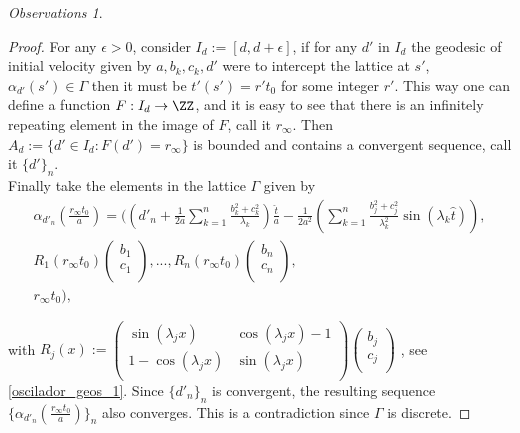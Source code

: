 \documentclass[11pt]{amsart}
\theoremstyle{plain}
\theoremstyle{definition}
\theoremstyle{remark}
\newtheorem{obs}[thm]{Observations}
\begin{document}
\begin{obs}
\begin{proof}
For any $\epsilon >0$, consider $I_d := [d, d+ \epsilon]$, if for any $d'$ in $I_d$ the geodesic of initial velocity given by $a, b_k,c_k, d'$ were to intercept the lattice at $s'$, $\alpha_{d'}(s') \in \Gamma$ then it must be $t'(s') = r' t_0$ for some integer $r'$. This way one can define a function $F: I_d \to \ZZ$, and it is easy to see that there is an infinitely repeating element in the image of $F$, call it $r_{\infty}$. Then $A_d:= \{ d' \in I_d : F(d')= r_{\infty} \}$ is bounded and contains a convergent sequence, call it $\{d'\}_n$.\\
    
Finally take the elements in the lattice $\Gamma$ given by
    \begin{eqnarray*}
    \alpha_{d'_n}(\frac{r_{\infty} t_0}{a}) = ( (d'_n + \frac{1}{2 a} \sum_{k=1}^{n} \frac{ b_{k}^{2}+c_k^{2}}{\lambda_k})\frac{\hat{t}}{a}- \frac{1}{2 a^{2}} (  \sum_{k=1}^{n} \frac{b_{j}^{2}+c_j^2}{\lambda_k^{2}} \sin(\lambda_k \hat{t}) ), \\ 
    R_1(r_{\infty} t_0)\left( \begin{matrix}
    b_1 \\
    c_1 \\
    \end{matrix} \right),..., R_n(r_{\infty} t_0)\left( \begin{matrix}
    b_n \\
    c_n \\
    \end{matrix} \right), \\     
    r_\infty t_0 ),
    \end{eqnarray*}

    with $R_j(x) := \left( \begin{matrix}
    \sin{(\lambda_j x)} & \cos{(\lambda_j x)} -1 \\
    1 - \cos{(\lambda_j x)} & \sin{(\lambda_j x)} \\
    \end{matrix} \right)
    \left( \begin{matrix}
    b_j \\
    c_j \\
    \end{matrix} \right)$ , see \eqref{oscilador_geos_1}. Since $\{d'_n\}_n$ is convergent, the resulting sequence $\{ \alpha_{d'_n}(\frac{r_{\infty} t_0}{a}) \}_n$ also converges. This is a contradiction since $\Gamma$ is discrete.

\end{proof}








\end{obs}
\end{document}
